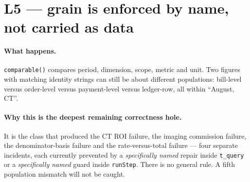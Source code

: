 \documentclass[11pt,a4paper]{report}
\newcommand{\code}[1]{\texttt{\small #1}}
\newenvironment{fitpic}
  {\par\medskip\begin{center}\begin{lrbox}{\fitbox}}
  {\end{lrbox}%
   \ifdim\wd\fitbox>\textwidth \resizebox{\textwidth}{!}{\usebox{\fitbox}}%
   \else \usebox{\fitbox}\fi
   \end{center}\medskip}
\begin{document}
\section{L5 --- grain is enforced by name, not carried as data}

\paragraph{What happens.} \code{comparable()} compares period, dimension, scope, metric and unit.
Two figures with matching identity strings can still be about different populations: bill-level
versus order-level versus payment-level versus ledger-row, all within ``August, CT''.

\paragraph{Why this is the deepest remaining correctness hole.} It is the class that produced the CT
ROI failure, the imaging commission failure, the denominator-basis failure and the
rate-versus-total failure --- four separate incidents, each currently prevented by a
\emph{specifically named} repair inside \code{t\_query} or a \emph{specifically named} guard inside
\code{runStep}. There is no general rule. A fifth population mismatch will not be caught.

\begin{fitpic}
\end{fitpic}
\end{document}
